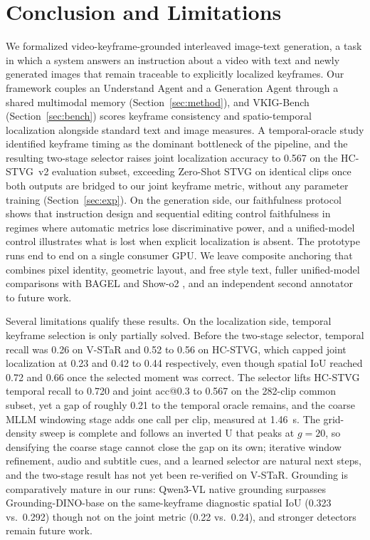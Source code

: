 
\section{Conclusion and Limitations}
\label{sec:concl}

We formalized video-keyframe-grounded interleaved image-text generation, a task in which a system answers an instruction about a video with text and newly generated images that remain traceable to explicitly localized keyframes. Our framework couples an Understand Agent and a Generation Agent through a shared multimodal memory (Section~\ref{sec:method}), and VKIG-Bench (Section~\ref{sec:bench}) scores keyframe consistency and spatio-temporal localization alongside standard text and image measures. A temporal-oracle study identified keyframe timing as the dominant bottleneck of the pipeline, and the resulting two-stage selector raises joint localization accuracy to 0.567 on the HC-STVG~v2 evaluation subset, exceeding Zero-Shot STVG \citep{zeroshotstvg2509} on identical clips once both outputs are bridged to our joint keyframe metric, without any parameter training (Section~\ref{sec:exp}). On the generation side, our faithfulness protocol shows that instruction design and sequential editing control faithfulness in regimes where automatic metrics lose discriminative power, and a unified-model control illustrates what is lost when explicit localization is absent. The prototype runs end to end on a single consumer GPU. We leave composite anchoring that combines pixel identity, geometric layout, and free style text, fuller unified-model comparisons with BAGEL \citep{bagel2505} and Show-o2 \citep{showo22506}, and an independent second annotator to future work.

Several limitations qualify these results. On the localization side, temporal keyframe selection is only partially solved. Before the two-stage selector, temporal recall was 0.26 on V-STaR and 0.52 to 0.56 on HC-STVG, which capped joint localization at 0.23 and 0.42 to 0.44 respectively, even though spatial IoU reached 0.72 and 0.66 once the selected moment was correct. The selector lifts HC-STVG temporal recall to 0.720 and joint acc@0.3 to 0.567 on the 282-clip common subset, yet a gap of roughly 0.21 to the temporal oracle remains, and the coarse MLLM windowing stage adds one call per clip, measured at 1.46~s. The grid-density sweep is complete and follows an inverted U that peaks at $g=20$, so densifying the coarse stage cannot close the gap on its own; iterative window refinement, audio and subtitle cues, and a learned selector are natural next steps, and the two-stage result has not yet been re-verified on V-STaR. Grounding is comparatively mature in our runs: Qwen3-VL native grounding surpasses Grounding-DINO-base on the same-keyframe diagnostic spatial IoU (0.323 vs.\ 0.292) though not on the joint metric (0.22 vs.\ 0.24), and stronger detectors remain future work.

